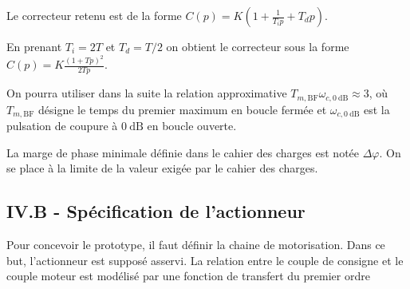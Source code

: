 \ifprof
\begin{corrige}
\end{corrige}
\else
\fi

Le correcteur retenu est de la forme
$
C(p)=K\left(1+\frac{1}{T_{i} p}+T_{d} p\right) .
$

En prenant $T_{i}=2 T$ et $T_{d}=T / 2$ on obtient le correcteur sous la forme
$
C(p)=K \frac{(1+T p)^{2}}{2 T p} .
$

On pourra utiliser dans la suite la relation approximative $T_{m, \mathrm{BF}} \omega_{c, 0 \mathrm{~dB}} \approx 3$, où $T_{m, \mathrm{BF}}$ désigne le temps du premier maximum en boucle fermée et $\omega_{c, 0 \mathrm{~dB}}$ est la pulsation de coupure à $0 \mathrm{~dB}$ en boucle ouverte.

La marge de phase minimale définie dans le cahier des charges est notée $\Delta \varphi$. On se place à la limite de la valeur exigée par le cahier des charges.

\ifprof
\begin{corrige}
\end{corrige}
\else
\fi

\ifprof
\begin{corrige}
\end{corrige}
\else
\fi

\ifprof
\begin{corrige}
\end{corrige}
\else
\fi

\subsection{IV.B - Spécification de l'actionneur}
Pour concevoir le prototype, il faut définir la chaine de motorisation. Dans ce but, l'actionneur est supposé asservi. La relation entre le couple de consigne et le couple moteur est modélisé par une fonction de transfert du premier ordre

